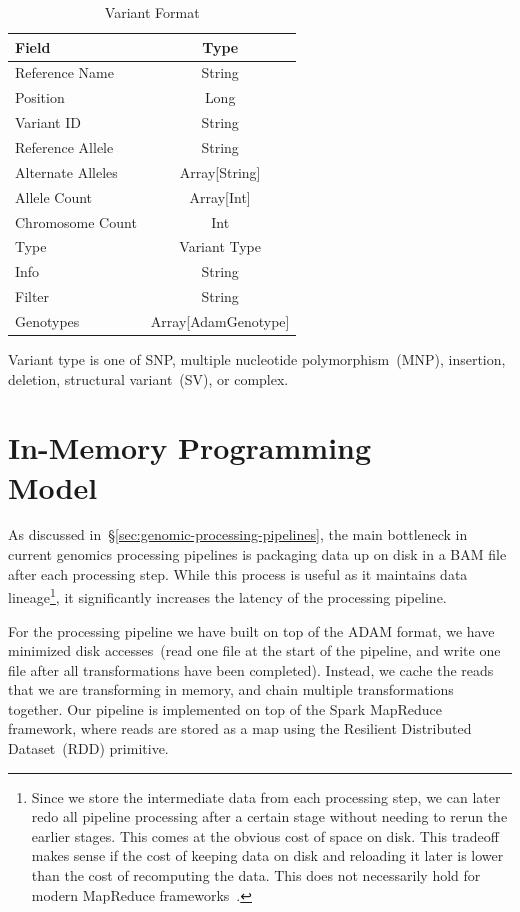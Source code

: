 \documentclass[10pt,twocolumn]{article}
\theoremstyle{plain}
\begin{document}
\begin{table}[h]
\caption{Variant Format}
\label{tab:variant-format}
\begin{center}
\begin{tabular}{| l | c |}
\hline
\bf Field & \bf Type \\
\hline
Reference Name & String \\
Position & Long \\
Variant ID & String \\
Reference Allele & String \\
Alternate Alleles & Array[String] \\
Allele Count & Array[Int] \\
Chromosome Count & Int \\
Type & Variant Type \\
Info & String \\
Filter & String \\
Genotypes & Array[AdamGenotype] \\
\hline
\end{tabular}
\end{center}
\end{table}

Variant type is one of SNP, multiple nucleotide polymorphism~(MNP), insertion, deletion, structural variant~(SV), or complex.

\section{In-Memory Programming\\Model}
\label{sec:in-memory-programming-model}

As discussed in~\S\ref{sec:genomic-processing-pipelines}, the main bottleneck in current genomics processing pipelines is
packaging data up on disk in a BAM file after each processing step. While this process is useful as it maintains data
lineage\footnote{Since we store the intermediate data from each processing step, we can later redo all pipeline processing
after a certain stage without needing to rerun the earlier stages. This comes at the obvious cost of space on disk. This tradeoff
makes sense if the cost of keeping data on disk and reloading it later is lower than the cost of recomputing the data. This
does not necessarily hold for modern MapReduce frameworks~\cite{zaharia12}.}, it significantly increases the latency of the
processing pipeline.

For the processing pipeline we have built on top of the ADAM format, we have minimized disk accesses~(read one file at the
start of the pipeline, and write one file after all transformations have been completed). Instead, we cache the reads that we are
transforming in memory, and chain multiple transformations together. Our pipeline is implemented on top of the Spark MapReduce
framework, where reads are stored as a map using the Resilient Distributed Dataset~(RDD) primitive.
\end{document}
